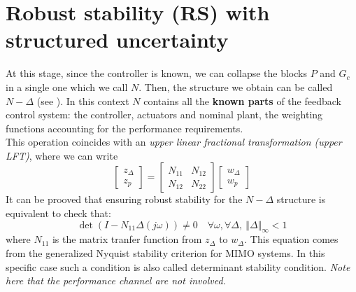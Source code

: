 \documentclass[a4paper, 12pt]{article}
\begin{document}
\section{Robust stability (RS) with structured uncertainty}
At this stage, since the controller is known, we can collapse the blocks $P$ and $G_c$ in a single one which we call $N$. Then, the structure we obtain can be called $N-\Delta$ (see ). In this context $N$ contains all the \textbf{known parts} of the feedback control system: the controller, actuators and nominal plant, the weighting functions accounting for the performance requirements.\\
This operation coincides with an \textit{upper linear fractional transformation (upper LFT)}, where we can write
\begin{equation}
    \begin{bmatrix}
        z_\Delta\\
        z_p
    \end{bmatrix}=\begin{bmatrix}
        N_{11}&N_{12}\\
        N_{12}&N_{22}
    \end{bmatrix}
    \begin{bmatrix}
        w_\Delta\\
        w_p
    \end{bmatrix}
\end{equation}
It can be prooved that ensuring robust stability for the $N-\Delta$ structure is equivalent to check that: 
\begin{equation}\label{eq:RS_cond}
    \det(I-N_{11}\Delta(j\omega))\ne0 \quad \forall \omega, \forall \Delta, \ \Vert \Delta \Vert_\infty<1
\end{equation}
where $N_{11}$ is the matrix tranfer function from $z_\Delta$ to $w_\Delta$. This equation comes from the generalized Nyquist stability criterion for MIMO systems. In this specific case such a condition is also called \textsf{determinant stability condition}. \emph{Note here that the performance channel are not involved.}
\end{document}
